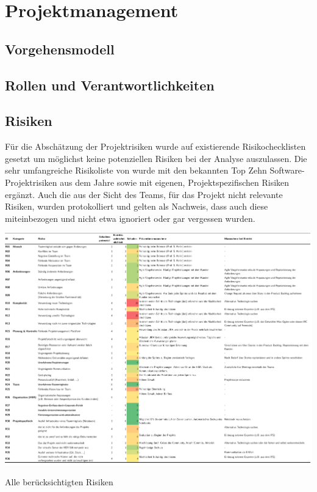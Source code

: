 \part{Projektmanagement}

\chapter{Vorgehensmodell}


\chapter{Rollen und Verantwortlichkeiten}


\chapter{Risiken}\label{sec:risiken}

Für die Abschätzung der Projektrisiken wurde auf existierende \cite{risk} Risikochecklisten gesetzt um möglichst keine potenziellen Risiken bei der Analyse auszulassen. Die sehr umfangreiche Risikoliste von \citeauthor{Wallace:2004:SPR:975817.975819} \cite{Wallace:2004:SPR:975817.975819} wurde mit den bekannten Top Zehn Software-Projektrisiken aus dem Jahre \citeyear{boehm} \cite{boehm} sowie mit eigenen, Projektspezifischen Risiken ergänzt.
Auch die aus der Sicht des Teams, für das Projekt nicht relevante Risiken, wurden protokolliert und gelten als Nachweis, dass auch diese miteinbezogen und nicht etwa ignoriert oder gar vergessen wurden.

\newpage
\begin{landscape}
	\begin{table}
		\centering
		\includegraphics[width=\linewidth,height=\textheight,keepaspectratio]{risikoanalyse.pdf}
		\caption{Alle berücksichtigten Risiken}
		\label{tab:risikoanalyse}
	\end{table}
\end{landscape}
\newpage


